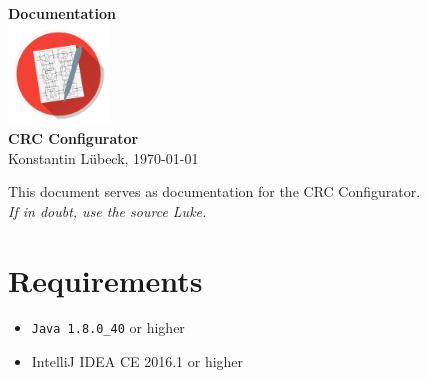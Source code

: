\documentclass{article}
\begin{document}
\begin{center}
{\Huge\bfseries Documentation}\\[2mm]
\includegraphics[width=0.2\textwidth]{../idea/src/icon/icon_512x512.png}\\[3mm]
{\Huge\bfseries CRC Configurator}\\[2mm]
Konstantin Lübeck, \today
\end{center}

\noindent This document serves as documentation for the CRC Configurator.\\

\hfill\textit{If in doubt, use the source Luke.}

\section*{Requirements}
\begin{itemize}
    \item \texttt{Java 1.8.0\_40} or higher
    \item IntelliJ IDEA CE 2016.1 or higher
\end{itemize}
\end{document}
